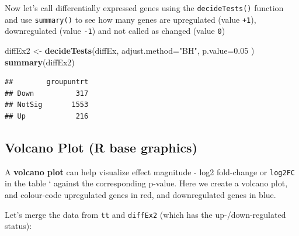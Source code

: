 \documentclass[
]{book}
\newenvironment{Shaded}{\begin{snugshade}}{\end{snugshade}}
\newcommand{\AttributeTok}[1]{\textcolor[rgb]{0.13,0.29,0.53}{#1}}
\newcommand{\CommentTok}[1]{\textcolor[rgb]{0.56,0.35,0.01}{\textit{#1}}}
\newcommand{\DecValTok}[1]{\textcolor[rgb]{0.00,0.00,0.81}{#1}}
\newcommand{\FloatTok}[1]{\textcolor[rgb]{0.00,0.00,0.81}{#1}}
\newcommand{\FunctionTok}[1]{\textcolor[rgb]{0.13,0.29,0.53}{\textbf{#1}}}
\newcommand{\NormalTok}[1]{#1}
\newcommand{\OtherTok}[1]{\textcolor[rgb]{0.56,0.35,0.01}{#1}}
\newcommand{\SpecialCharTok}[1]{\textcolor[rgb]{0.81,0.36,0.00}{\textbf{#1}}}
\newcommand{\StringTok}[1]{\textcolor[rgb]{0.31,0.60,0.02}{#1}}
\begin{document}
Now let's call differentially expressed genes using the \texttt{decideTests()} function and use \texttt{summary()} to see how many genes are upregulated (value \texttt{+1}), downregulated (value \texttt{-1}) and not called as changed (value \texttt{0})

\begin{Shaded}
\begin{Highlighting}[]
\NormalTok{diffEx2 }\OtherTok{\textless{}{-}} \FunctionTok{decideTests}\NormalTok{(diffEx, }
    \AttributeTok{adjust.method=}\StringTok{"BH"}\NormalTok{, }
    \AttributeTok{p.value=}\FloatTok{0.05}
\NormalTok{)}
\FunctionTok{summary}\NormalTok{(diffEx2)}
\end{Highlighting}
\end{Shaded}

\begin{verbatim}
##        groupuntrt
## Down          317
## NotSig       1553
## Up            216
\end{verbatim}

\subsection{Volcano Plot (R base graphics)}\label{volcano-plot-r-base-graphics}

A \textbf{volcano plot} can help visualize effect magnitude - log2 fold-change or \texttt{log2FC} in the table ` against the corresponding p-value. Here we create a volcano plot, and colour-code upregulated genes in red, and downregulated genes in blue.

Let's merge the data from \texttt{tt} and \texttt{diffEx2} (which has the up-/down-regulated status):

\begin{Shaded}
\end{Shaded}
\end{document}
